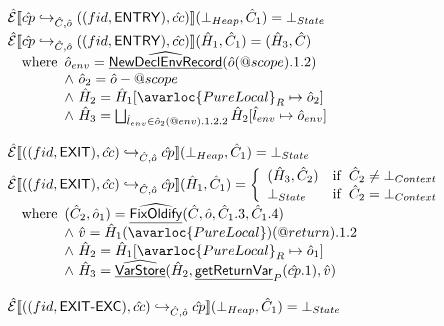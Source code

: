 \[
\begin{array}{l}
\aE \lbr \acp \cfgnext_{\hat{C},\hat{o}} ((fid,\SF{ENTRY}),\hat{cc}) \rbr (\bot_{Heap},\hat{C}_1) = \bot_{State}
\vspace{1mm}\\

\aE \lbr \acp \cfgnext_{\hat{C},\hat{o}} ((fid,\SF{ENTRY}),\hat{cc}) \rbr (\hat{H}_1,\hat{C}_1) = (\hat{H}_3,\hat{C}) \\
  \quad\wherec{
    \hat{o}_{env} = \ahf{NewDeclEnvRecord}(\hat{o}(\varprop{scope}).1.2) \\
    \land\ \hat{o}_2 = \hat{o} - \varprop{scope} \\
    \land\ \hat{H}_2 = \hat{H}_1[\avarloc{PureLocal}_R \mapsto \hat{o}_2] \\
    \land\ \hat{H}_3 = \bigsqcup_{\hat{l}_{env}\in\hat{o}_2(\varprop{env}).1.2.2} \hat{H}_2[\hat{l}_{env} \mapsto \hat{o}_{env}]
  }
\\\\

\aE \lbr ((fid,\SF{EXIT}),\hat{cc}) \cfgnext_{\hat{C},\hat{o}} \acp \rbr (\bot_{Heap},\hat{C}_1) = \bot_{State} 
\vspace{1mm}\\

\aE \lbr ((fid,\SF{EXIT}),\hat{cc}) \cfgnext_{\hat{C},\hat{o}} \acp \rbr (\hat{H}_1,\hat{C}_1) =
  \left\{
    \begin{array}{ll}
      (\hat{H}_3, \hat{C}_2) & \ifc{\hat{C}_2 \neq \bot_{Context}} \\
      \bot_{State} & \ifc{\hat{C}_2 = \bot_{Context}} \\
    \end{array}
  \right.\\
  \quad\wherec{
    (\hat{C}_2, \hat{o}_1) = \ahf{FixOldify}(\hat{C}, \hat{o}, \hat{C}_1.3, \hat{C}_1.4) \\ 
    \land\ \hat{v} = \hat{H}_1(\avarloc{PureLocal})(\varprop{return}).1.2 \\
    \land\ \hat{H}_2 = \hat{H}_1[\avarloc{PureLocal}_R \mapsto \hat{o}_1] \\
    \land\ \hat{H}_3 = \ahf{VarStore}(\hat{H}_2, \chf{getReturnVar}_P(\acp.1), \hat{v})
  }
\\\\

\aE \lbr ((fid,\SF{EXIT-EXC}),\hat{cc}) \cfgnext_{\hat{C},\hat{o}} \acp \rbr (\bot_{Heap},\hat{C}_1) = \bot_{State}
\vspace{1mm}\\


\end{array}\]
